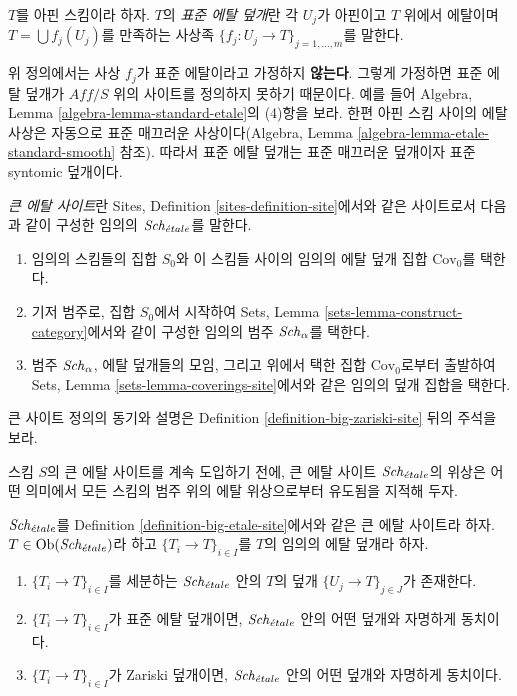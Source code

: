 \begin{definition}
\label{definition-standard-etale}
$T$를 아핀 스킴이라 하자. $T$의 {\it 표준 에탈 덮개}란 각 $U_j$가
아핀이고 $T$ 위에서 에탈이며 $T = \bigcup f_j(U_j)$를 만족하는 사상족
$\{f_j : U_j \to T\}_{j = 1, \ldots, m}$를 말한다.
\end{definition}

\noindent
위 정의에서는 사상 $f_j$가 표준 에탈이라고 가정하지 {\bf 않는다}.
그렇게 가정하면 표준 에탈 덮개가 $\textit{Aff}/S$ 위의 사이트를
정의하지 못하기 때문이다. 예를 들어 Algebra, Lemma
\ref{algebra-lemma-standard-etale}의 (4)항을 보라. 한편 아핀 스킴
사이의 에탈 사상은 자동으로 표준 매끄러운 사상이다(Algebra, Lemma
\ref{algebra-lemma-etale-standard-smooth} 참조). 따라서 표준 에탈
덮개는 표준 매끄러운 덮개이자 표준 syntomic 덮개이다.

\begin{definition}
\label{definition-big-etale-site}
{\it 큰 에탈 사이트}란 Sites, Definition
\ref{sites-definition-site}에서와 같은 사이트로서 다음과 같이 구성한
임의의 $\mathit{Sch}_{\acute{e}tale}$를 말한다.
\begin{enumerate}
\item 임의의 스킴들의 집합 $S_0$와 이 스킴들 사이의 임의의 에탈 덮개
집합 $\text{Cov}_0$를 택한다.
\item 기저 범주로, 집합 $S_0$에서 시작하여 Sets, Lemma
\ref{sets-lemma-construct-category}에서와 같이 구성한 임의의 범주
$\mathit{Sch}_\alpha$를 택한다.
\item 범주 $\mathit{Sch}_\alpha$, 에탈 덮개들의 모임, 그리고 위에서 택한 집합
$\text{Cov}_0$로부터 출발하여 Sets, Lemma
\ref{sets-lemma-coverings-site}에서와 같은 임의의 덮개 집합을 택한다.
\end{enumerate}
\end{definition}

\noindent
큰 사이트 정의의 동기와 설명은 Definition
\ref{definition-big-zariski-site} 뒤의 주석을 보라.

\medskip\noindent
스킴 $S$의 큰 에탈 사이트를 계속 도입하기 전에, 큰 에탈 사이트
$\mathit{Sch}_{\acute{e}tale}$의 위상은 어떤 의미에서 모든 스킴의 범주 위의 에탈
위상으로부터 유도됨을 지적해 두자.

\begin{lemma}
\label{lemma-etale-induced}
$\mathit{Sch}_{\acute{e}tale}$를 Definition \ref{definition-big-etale-site}에서와 같은
큰 에탈 사이트라 하자. $T \in \mathop{\mathrm{Ob}}\nolimits(\mathit{Sch}_{\acute{e}tale})$라 하고
$\{T_i \to T\}_{i \in I}$를 $T$의 임의의 에탈 덮개라 하자.
\begin{enumerate}
\item $\{T_i \to T\}_{i \in I}$를 세분하는 $\mathit{Sch}_{\acute{e}tale}$ 안의 $T$의
덮개 $\{U_j \to T\}_{j \in J}$가 존재한다.
\item $\{T_i \to T\}_{i \in I}$가 표준 에탈 덮개이면,
$\mathit{Sch}_{\acute{e}tale}$ 안의 어떤 덮개와 자명하게 동치이다.
\item $\{T_i \to T\}_{i \in I}$가 Zariski 덮개이면,
$\mathit{Sch}_{\acute{e}tale}$ 안의 어떤 덮개와 자명하게 동치이다.
\end{enumerate}
\end{lemma}


